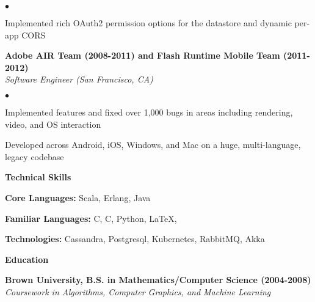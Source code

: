 \documentclass[ComputerScience]{vita}
\newcommand{\CPP}
{C\nolinebreak[4]\hspace{-.05em}\raisebox{.60ex}{\tiny\bf ++}}
\newenvironment{suber}[0]
{\begin{list}{$\bullet$}
	{\setlength{\topsep}{-0.4in}
		\setlength{\leftmargin}{0.25in}
		\setlength{\itemsep}{0.01in}}
}
{\end{list}\par}
\begin{document}
\begin{vita}
\begin{list}{}{\setlength{\leftmargin}{.25in}}
\begin{suber}
	\item Implemented rich OAuth2 permission options for the datastore and dynamic per-app CORS
    \end{suber}
    \item {\bf Adobe AIR Team (2008-2011) and Flash Runtime Mobile Team (2011-2012)}\\
    {\em Software Engineer (San Francisco, CA)}
    \begin{suber}
	\item Implemented features and fixed over 1,000 bugs in areas including rendering, video, and OS interaction 
	\item Developed across  Android, iOS, Windows, and Mac on a huge, multi-language, legacy codebase
    \end{suber}
\end{list}
{\bf{\large Technical Skills}}\ \hrulefill
\begin{list}{}{\setlength{\leftmargin}{.25in}}
	\item {\bf Core Languages:} Scala, Erlang, Java
	\item {\bf Familiar Languages:} C, \CPP, Python, \LaTeX{}, 
	\item {\bf Technologies:} Cassandra, Postgresql, Kubernetes, RabbitMQ, Akka
\end{list}
{\bf {\large Education}}\ \hrulefill
\begin{list}{}{\setlength{\leftmargin}{.25in}}
\item {\bf Brown University,
	B.S. in Mathematics/Computer Science (2004-2008)}\\
	{\em Coursework in Algorithms, Computer Graphics, and Machine Learning }
\end{list}
\end{vita}
\end{document}
